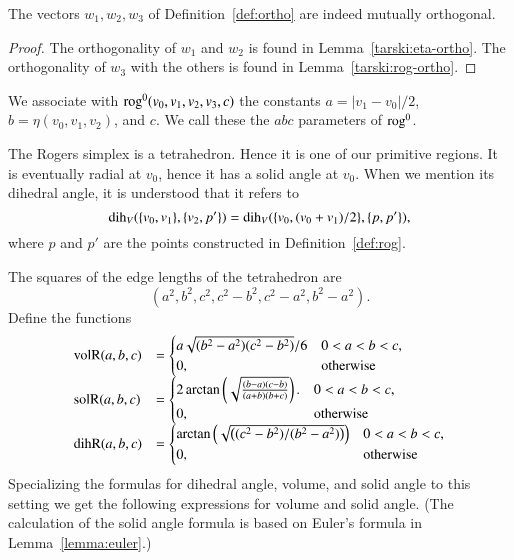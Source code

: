 \begin{lemma} The vectors $w_1,w_2,w_3$ of Definition~\ref{def:ortho}
are indeed mutually orthogonal.
\end{lemma}

\begin{proof} The orthogonality of $w_1$ and $w_2$ is found in
Lemma~\ref{tarski:eta-ortho}.  The orthogonality of $w_3$ with the
others is found in Lemma~\ref{tarski:rog-ortho}.
\end{proof}

\begin{definition}
We associate with ${\operatorname{rog}}^0(v_0,v_1,v_2,v_3,c)$ the constants
$a=|v_1-v_0|/2$, $b=\eta(v_0,v_1,v_2)$, and $c$.
We call these the $abc$ parameters of ${\operatorname{rog}}^0$. 
\end{definition}

The Rogers simplex is a tetrahedron.  Hence it is one of our
primitive regions.  It is eventually radial at $v_0$, hence
it has a solid angle at $v_0$.  When we mention its dihedral
angle, it is understood that it refers to 
   $$
   \operatorname{dih}_V(\{v_0,v_1\},\{v_2,p'\})=\operatorname{dih}_V(\{v_0,(v_0+v_1)/2\},\{p,p'\}),
   $$
where $p$ and $p'$ are the points 
constructed in Definition~\ref{def:rog}.

The squares of the edge lengths of the tetrahedron are
   $$
   (a^2,b^2,c^2,c^2-b^2,c^2-a^2,b^2-a^2).
   $$
Define the functions
   $$
   \begin{array}{lll}
     {\operatorname{volR}}(a,b,c) &= \begin{cases}
       a\sqrt{(b^2-a^2)(c^2-b^2)}/6& 0 < a < b < c,\\
       0,&\text{otherwise}
       \end{cases}\\
     {\operatorname{solR}}(a,b,c) &= \begin{cases}
      2 \arctan\left(\sqrt{\frac{(b-a) (c-b)}{(a+b)
   (b+c)}}\right).& 0 < a < b < c,\\
      0,&\text{otherwise}
     \end{cases}\\
     {\operatorname{dihR}}(a,b,c) &= \begin{cases}
      \arctan\left(\sqrt{\left((c^2 - b^2)/(b^2 - a^2)\right)}\right)
      & 0 < a < b < c,\\
      0,&\text{otherwise}
     \end{cases}
     \end{array}
   $$
Specializing the formulas for dihedral angle, volume, and solid angle to this
setting we get the following expressions for volume and solid angle.
(The calculation of the
 solid angle formula is based on Euler's formula in 
Lemma~\ref{lemma:euler}.)

